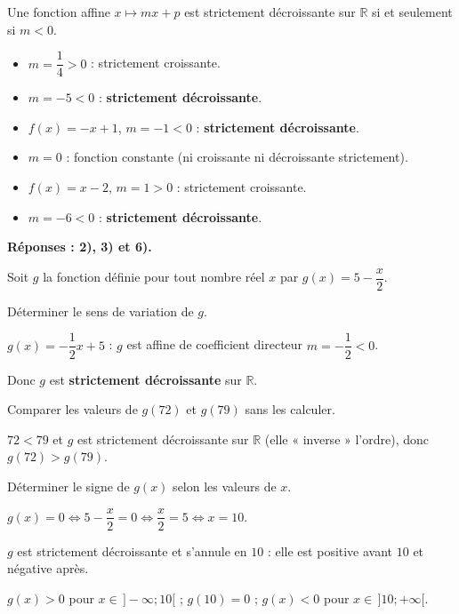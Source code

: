 \documentclass[12pt,a4paper]{book}
\begin{document}
\begin{corrBox}
	Une fonction affine $x\mapsto mx+p$ est strictement décroissante sur $\mathbb{R}$ si et seulement si $m<0$.
	\begin{itemize}
		\item[1)] $m=\dfrac{1}{4}>0$ : strictement croissante.
		\item[2)] $m=-5<0$ : \textbf{strictement décroissante}.
		\item[3)] $f(x)=-x+1$, $m=-1<0$ : \textbf{strictement décroissante}.
		\item[4)] $m=0$ : fonction constante (ni croissante ni décroissante strictement).
		\item[5)] $f(x)=x-2$, $m=1>0$ : strictement croissante.
		\item[6)] $m=-6<0$ : \textbf{strictement décroissante}.
	\end{itemize}
	\textbf{Réponses : 2), 3) et 6).}
\end{corrBox}

\exerciceDS{}

Soit $g$ la fonction définie pour tout nombre réel $x$ par $g(x)=5-\dfrac{x}{2}$.
\begin{enumMet}
	\item Déterminer le sens de variation de $g$.

	\begin{corrBox}
		$g(x)=-\dfrac{1}{2}x+5$ : $g$ est affine de coefficient directeur $m=-\dfrac{1}{2}<0$.

		Donc $g$ est \textbf{strictement décroissante} sur $\mathbb{R}$.
	\end{corrBox}
	\item Comparer les valeurs de $g(72)$ et $g(79)$ sans les calculer.

	\begin{corrBox}
		$72<79$ et $g$ est strictement décroissante sur $\mathbb{R}$ (elle « inverse » l'ordre), donc $g(72)>g(79)$.
	\end{corrBox}
	\item Déterminer le signe de $g(x)$ selon les valeurs de $x$.

	\begin{corrBox}
		$g(x)=0 \iff 5-\dfrac{x}{2}=0 \iff \dfrac{x}{2}=5 \iff x=10$.

		$g$ est strictement décroissante et s'annule en $10$ : elle est positive avant $10$ et négative après.

		\begin{center}
		\end{center}
		$g(x)>0$ pour $x\in\,]-\infty;10[$ ; $g(10)=0$ ; $g(x)<0$ pour $x\in\,]10;+\infty[$.
	\end{corrBox}
\end{enumMet}
\end{document}
